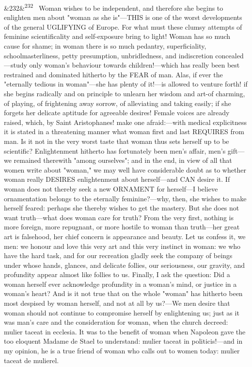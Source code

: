 \documentclass[12pt]{article}
\newcommand{\para}[1][]{\par\noindent\ifx&#1&\else\textsuperscript{\footnotesize #1}~\fi}
\begin{document}
\para[232] Woman wishes to be independent, and therefore she begins to enlighten men about "woman as she is"---THIS is one of the worst developments of the general UGLIFYING of Europe. For what must these clumsy attempts of feminine scientificality and self-exposure bring to light! Woman has so much cause for shame; in woman there is so much pedantry, superficiality, schoolmasterliness, petty presumption, unbridledness, and indiscretion concealed---study only woman's behaviour towards children!---which has really been best restrained and dominated hitherto by the FEAR of man. Alas, if ever the "eternally tedious in woman"---she has plenty of it!---is allowed to venture forth! if she begins radically and on principle to unlearn her wisdom and art-of charming, of playing, of frightening away sorrow, of alleviating and taking easily; if she forgets her delicate aptitude for agreeable desires! Female voices are already raised, which, by Saint Aristophanes! make one afraid:---with medical explicitness it is stated in a threatening manner what woman first and last REQUIRES from man. Is it not in the very worst taste that woman thus sets herself up to be scientific? Enlightenment hitherto has fortunately been men's affair, men's gift---we remained therewith "among ourselves"; and in the end, in view of all that women write about "woman," we may well have considerable doubt as to whether woman really DESIRES enlightenment about herself---and CAN desire it. If woman does not thereby seek a new ORNAMENT for herself---I believe ornamentation belongs to the eternally feminine?---why, then, she wishes to make herself feared: perhaps she thereby wishes to get the mastery. But she does not want truth---what does woman care for truth? From the very first, nothing is more foreign, more repugnant, or more hostile to woman than truth---her great art is falsehood, her chief concern is appearance and beauty. Let us confess it, we men: we honour and love this very art and this very instinct in woman: we who have the hard task, and for our recreation gladly seek the company of beings under whose hands, glances, and delicate follies, our seriousness, our gravity, and profundity appear almost like follies to us. Finally, I ask the question: Did a woman herself ever acknowledge profundity in a woman's mind, or justice in a woman's heart? And is it not true that on the whole "woman" has hitherto been most despised by woman herself, and not at all by us?---We men desire that woman should not continue to compromise herself by enlightening us; just as it was man's care and the consideration for woman, when the church decreed: mulier taceat in ecclesia. It was to the benefit of woman when Napoleon gave the too eloquent Madame de Stael to understand: mulier taceat in politicis!---and in my opinion, he is a true friend of woman who calls out to women today: mulier taceat de mulierel.
\end{document}
